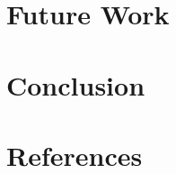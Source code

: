 \documentclass[12pt,a4paper]{article}
\begin{document}

\newpage

\section{Future Work}
\label{FutureWork}


\newpage

\section{Conclusion}
\label{Conclusion}


\newpage

\section{References}
\printbibliography

\newpage
\appendix


\end{document}
